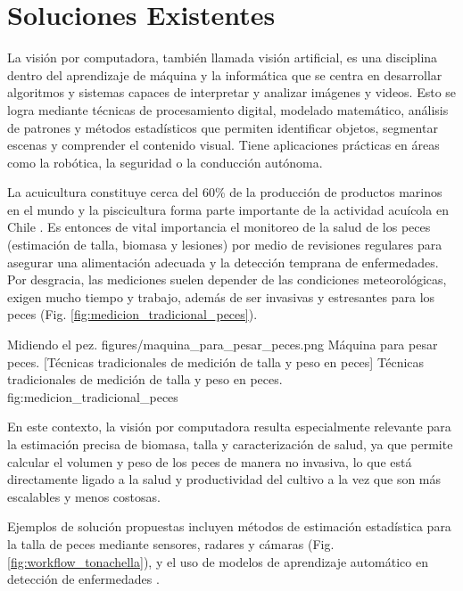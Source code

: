 \label{part:chap2_estado_del_arte}
\section{Soluciones Existentes}
La visión por computadora, también llamada visión artificial, es una disciplina dentro del aprendizaje de máquina y la informática que se centra en desarrollar algoritmos y sistemas capaces de interpretar y analizar imágenes y videos. Esto se logra mediante técnicas de procesamiento digital, modelado matemático, análisis de patrones y métodos estadísticos que permiten identificar objetos, segmentar escenas y comprender el contenido visual. Tiene aplicaciones prácticas en áreas como la robótica, la seguridad o la conducción autónoma.

La acuicultura constituye cerca del 60\% de la producción de productos marinos en el mundo \cite{FAO2024} y la piscicultura forma parte importante de la actividad acuícola en Chile \cite{chile2017levantamiento}. Es entonces de vital importancia el monitoreo de la salud de los peces (estimación de talla, biomasa y lesiones) por medio de revisiones regulares para asegurar una alimentación adecuada y la detección temprana de enfermedades. Por desgracia, las mediciones suelen depender de las condiciones meteorológicas, exigen mucho tiempo y trabajo, además de ser invasivas y estresantes para los peces \cite{Tonachella2022} (Fig. \ref{fig:medicion_tradicional_peces}).

{Midiendo el pez.\label{fig:midiendo_pez}}%
{figures/maquina_para_pesar_peces.png}%
{Máquina para pesar peces.\label{fig:maquina_para_pesar_peces}}%
[Técnicas tradicionales de medición de talla y peso en peces]%
{Técnicas tradicionales de medición de talla y peso en peces.}%
{fig:medicion_tradicional_peces}%
    
En este contexto, la visión por computadora resulta especialmente relevante para la estimación precisa de biomasa, talla y caracterización de salud, ya que permite calcular el volumen y peso de los peces de manera no invasiva, lo que está directamente ligado a la salud y productividad del cultivo a la vez que son más escalables y menos costosas.

Ejemplos de solución propuestas incluyen métodos de estimación estadística para la talla de peces mediante sensores, radares y cámaras \cite{Tonachella2022} (Fig. \ref{fig:workflow_tonachella}), y el uso de modelos de aprendizaje automático en detección de enfermedades \cite{Ahmed2022}. %

